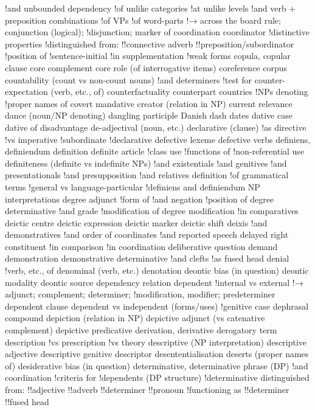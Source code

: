 !and unbounded dependency
!of unlike categories
!at unlike levels
!and verb + preposition combinations
!of VPs
!of word-parts
!→ across the board rule; conjunction (logical);
!disjunction; marker of coordination
coordinator
!distinctive properties
!distinguished from:
!!connective adverb
!!preposition/subordinator
!position of
!sentence-initial
!in supplementation
!weak forms
copula, copular clause
core complement
core role (of interrogative items)
coreference
corpus
countability (count vs non-count nouns)
!and determiners
!test for
counter-expectation (verb, etc., of)
counterfactuality
counterpart
countries
!NPs denoting
!proper names of
covert mandative
creator (relation in NP)
current relevance
dance (noun/NP denoting)
dangling participle
Danish
dash
dates
dative case
dative of disadvantage
de-adjectival (noun, etc.)
declarative (clause)
!as directive
!vs imperative
!subordinate
!declarative
defective lexeme
defective verbs
definiens, definiendum
definition
definite article
!class use
!functions of
!non-referential use
definiteness (definite vs indefinite NPs)
!and existentials
!and genitives
!and presentationals
!and presupposition
!and relatives
definition
!of grammatical terms
!general vs language-particular
!definiens and definiendum NP interpretations
degree adjunct
!form of
!and negation
!position of
degree determinative
!and grade
!modification of
degree modification
!in comparatives
deictic centre
deictic expression
deictic marker
deictic shift
deixis
!and demonstratives
!and order of coordinates
!and reported speech
delayed right constituent
!in comparison
!in coordination
deliberative question
demand
demonstration
demonstrative determinative
!and clefts
!as fused head
denial
!verb, etc., of
denominal (verb, etc.)
denotation
deontic bias (in question)
deontic modality
deontic source
dependency relation
dependent
!internal vs external
!→ adjunct; complement; determiner;
!modification, modifier; predeterminer
dependent clause
dependent vs independent (forms/uses)
!genitive case
dephrasal compound
depiction (relation in NP)
depictive adjunct (vs catenative complement)
depictive predicative
derivation, derivative
derogatory term
description
!vs prescription
!vs theory
descriptive (NP interpretation)
descriptive adjective
descriptive genitive
descriptor
desententialisation
deserts (proper names of)
desiderative bias (in question)
determinative, determinative phrase (DP)
!and coordination
!criteria for
!dependents (DP structure)
!determinative distinguished from:
!!adjective
!!adverb
!!determiner
!!pronoun
!functioning as
!!determiner
!!fused head
